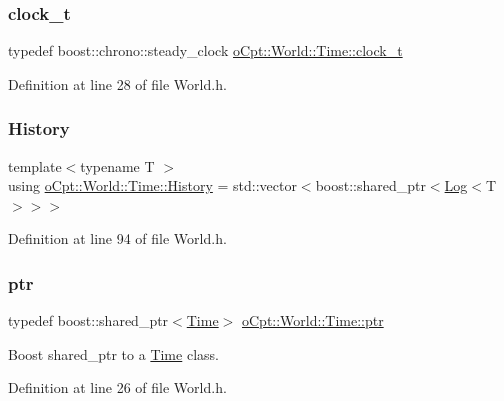 \subsubsection{\texorpdfstring{clock\+\_\+t}{clock\_t}}
{\footnotesize\ttfamily typedef boost\+::chrono\+::steady\+\_\+clock \hyperlink{classo_cpt_1_1_world_1_1_time_ac41de01610f32d0ace4844ed3bf454f7}{o\+Cpt\+::\+World\+::\+Time\+::clock\+\_\+t}}



Definition at line 28 of file World.\+h.

\hypertarget{classo_cpt_1_1_world_1_1_time_a7c51955f1bccc0f26b8a3d35599b6135}{}\label{classo_cpt_1_1_world_1_1_time_a7c51955f1bccc0f26b8a3d35599b6135} 
\subsubsection{\texorpdfstring{History}{History}}
{\footnotesize\ttfamily template$<$typename T $>$ \\
using \hyperlink{classo_cpt_1_1_world_1_1_time_a7c51955f1bccc0f26b8a3d35599b6135}{o\+Cpt\+::\+World\+::\+Time\+::\+History} =  std\+::vector$<$boost\+::shared\+\_\+ptr$<$\hyperlink{classo_cpt_1_1_world_1_1_time_1_1_log}{Log}$<$T$>$$>$$>$}



Definition at line 94 of file World.\+h.

\hypertarget{classo_cpt_1_1_world_1_1_time_ae99716d20374e14ec5053765a9921ef2}{}\label{classo_cpt_1_1_world_1_1_time_ae99716d20374e14ec5053765a9921ef2} 
\subsubsection{\texorpdfstring{ptr}{ptr}}
{\footnotesize\ttfamily typedef boost\+::shared\+\_\+ptr$<$\hyperlink{classo_cpt_1_1_world_1_1_time}{Time}$>$ \hyperlink{classo_cpt_1_1_world_1_1_time_ae99716d20374e14ec5053765a9921ef2}{o\+Cpt\+::\+World\+::\+Time\+::ptr}}



Boost shared\+\_\+ptr to a \hyperlink{classo_cpt_1_1_world_1_1_time}{Time} class. 



Definition at line 26 of file World.\+h.

